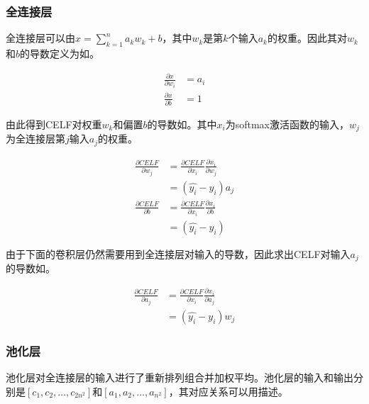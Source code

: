 \subsubsection{全连接层}

全连接层可以由$x=\sum_{k=1}^{n}{a_k w_k} + b$，其中$w_k$是第$k$个输入$a_k$的权重。因此其对$w_k$和$b$的导数定义为如。

\begin{equation}\label{eq:affine-bp}
\begin{aligned}
\frac{\partial x}{\partial w_i} &= a_i \\
\frac{\partial x}{\partial b} &= 1
\end{aligned}
\end{equation}

由此得到CELF对权重$w_k$和偏置$b$的导数如。其中$x_i$为softmax激活函数的输入，$w_j$为全连接层第$j$输入$a_j$的权重。

\begin{equation}\label{eq:CELF-affline-w-b}
\begin{aligned}
\frac{\partial CELF}{\partial w_j} &=
\frac{\partial CELF}{\partial x_i} \frac{\partial x_i}{\partial w_j} \\
&= (\hat{y_i} - y_i)a_j \\
\frac{\partial CELF}{\partial b} &=
\frac{\partial CELF}{\partial x_i} \frac{\partial x_i}{\partial b} \\
&= (\hat{y_i} - y_i)
\end{aligned}
\end{equation}

由于下面的卷积层仍然需要用到全连接层对输入的导数，因此求出CELF对输入$a_j$的导数如。

\begin{equation}\label{eq:affine-a-bp}
\begin{aligned}
\frac{\partial CELF}{\partial a_j} &=
\frac{\partial CELF}{\partial x_i} \frac{\partial x_i}{\partial a_j} \\
&= (\hat{y_i} - y_i)w_j
\end{aligned}
\end{equation}

\subsubsection{池化层}

池化层对全连接层的输入进行了重新排列组合并加权平均。池化层的输入和输出分别是$[c_1, c_2, \dots, c_{2n^2}]$和$[a_1, a_2, \dots , a_{n^2}]$，其对应关系可以用描述。


